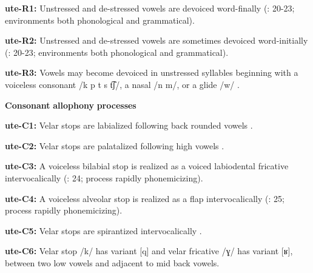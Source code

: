 \begin{styleBody}
\textbf{ute-R1:} Unstressed and de-stressed vowels are devoiced word-finally (\citealt{Givón2011}: 20-23; environments both phonological and grammatical).
\end{styleBody}

\begin{styleBody}
\textbf{ute-R2:} Unstressed and de-stressed vowels are sometimes devoiced word-initially (\citealt{Givón2011}: 20-23; environments both phonological and grammatical).
\end{styleBody}

\begin{styleBody}
\textbf{ute-R3:} Vowels may become devoiced in unstressed syllables beginning with a voiceless consonant /k p t s t͡ʃ/, a nasal /n m/, or a glide /w/ \citep[21]{Givón2011}.
\end{styleBody}

\begin{styleBody}
\textbf{Consonant} \textbf{allophony} \textbf{processes}
\end{styleBody}

\begin{styleBody}
\textbf{ute-C1:} Velar stops are labialized following back rounded vowels \citep[29]{Givón2011}.
\end{styleBody}

\begin{styleBody}
\textbf{ute-C2:} Velar stops are palatalized following high vowels \citep[29]{Givón2011}.
\end{styleBody}

\begin{styleBody}
\textbf{ute-C3:} A voiceless bilabial stop is realized as a voiced labiodental fricative intervocalically (\citealt{Givón2011}: 24; process rapidly phonemicizing).
\end{styleBody}

\begin{styleBody}
\textbf{ute-C4:} A voiceless alveolar stop is realized as a flap intervocalically (\citealt{Givón2011}: 25; process rapidly phonemicizing).
\end{styleBody}

\begin{styleBody}
\textbf{ute-C5:} Velar stops are spirantized intervocalically \citep[26-7]{Givón2011}.
\end{styleBody}

\begin{styleBody}
\textbf{ute-C6:} Velar stop /k/ has variant [q] and velar fricative /ɣ/ has variant [ʁ], between two low vowels and adjacent to mid back vowels.
\end{styleBody}

